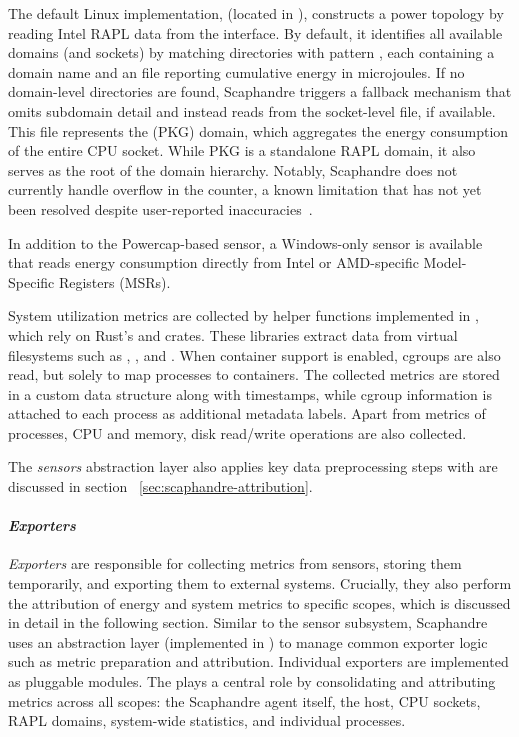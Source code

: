 The default Linux implementation,  (located in ), constructs a power topology by reading Intel RAPL data from the  interface. By default, it identifies all available domains (and sockets) by matching directories with pattern , each containing a domain name and an  file reporting cumulative energy in microjoules. If no domain-level directories are found, Scaphandre triggers a fallback mechanism that omits subdomain detail and instead reads from the socket-level file, if available. This file represents the  (PKG) domain, which aggregates the energy consumption of the entire CPU socket. While PKG is a standalone RAPL domain, it also serves as the root of the domain hierarchy. Notably, Scaphandre does not currently handle overflow in the  counter, a known limitation that has not yet been resolved despite user-reported inaccuracies~\cite{scaphandre_issue280}.

In addition to the Powercap-based sensor, a Windows-only sensor is available that reads energy consumption directly from Intel or AMD-specific Model-Specific Registers (MSRs).

System utilization metrics are collected by helper functions implemented in , which rely on Rust’s  and  crates. These libraries extract data from virtual filesystems such as , , and . When container support is enabled, cgroups are also read, but solely to map processes to containers. The collected metrics are stored in a custom data structure along with timestamps, while cgroup information is attached to each process as additional metadata labels. Apart from metrics of processes, CPU and memory, disk read/write operations are also collected.

The \textit{sensors} abstraction layer also applies key data preprocessing steps with are discussed in section ~\ref{sec:scaphandre-attribution}.

\paragraph{\textit{Exporters}}
\textit{Exporters} are responsible for collecting metrics from sensors, storing them temporarily, and exporting them to external systems. Crucially, they also perform the attribution of energy and system metrics to specific scopes, which is discussed in detail in the following section. Similar to the sensor subsystem, Scaphandre uses an abstraction layer (implemented in ) to manage common exporter logic such as metric preparation and attribution. Individual exporters are implemented as pluggable modules. The  plays a central role by consolidating and attributing metrics across all scopes: the Scaphandre agent itself, the host, CPU sockets, RAPL domains, system-wide statistics, and individual processes.

